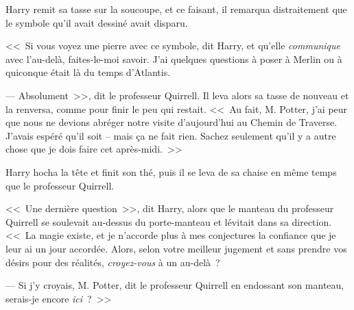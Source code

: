 Harry remit sa tasse sur la soucoupe, et ce faisant, il remarqua distraitement que le symbole qu'il avait dessiné avait disparu.

<<~Si vous voyez une pierre avec ce symbole, dit Harry, et qu'elle \emph{communique} avec l'au-delà, faites-le-moi savoir. J'ai quelques questions à poser à Merlin ou à quiconque était là du temps d'Atlantis.

--- Absolument~>>, dit le professeur Quirrell. Il leva alors sa tasse de nouveau et la renversa, comme pour finir le peu qui restait. <<~Au fait, M. Potter, j'ai peur que nous ne devions abréger notre visite d'aujourd'hui au Chemin de Traverse. J'avais espéré qu'il soit -- mais ça ne fait rien. Sachez seulement qu'il y a autre chose que je dois faire cet après-midi.~>>

Harry hocha la tête et finit son thé, puis il se leva de sa chaise en même temps que le professeur Quirrell.

<<~Une dernière question~>>, dit Harry, alors que le manteau du professeur Quirrell se soulevait au-dessus du porte-manteau et lévitait dans sa direction. <<~La magie existe, et je n'accorde plus à mes conjectures la confiance que je leur ai un jour accordée. Alors, selon votre meilleur jugement et sans prendre vos désirs pour des réalités, \emph{croyez-vous} à un au-delà~?

--- Si j'y croyais, M. Potter, dit le professeur Quirrell en endossant son manteau, serais-je encore \emph{ici}~?~>>

